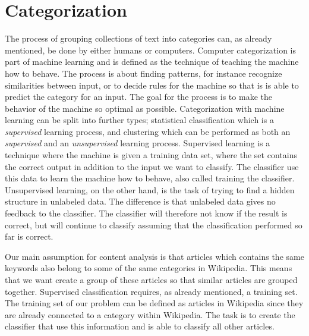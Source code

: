 \section{Categorization}
The process of grouping collections of text into categories can, as already mentioned, be done by either humans or computers. Computer categorization is part of machine learning and is defined as the technique of teaching the machine how to behave. The process is about finding patterns, for instance recognize similarities between input, or to decide rules for the machine so that is is able to predict the category for an input. The goal for the process is to make the behavior of the machine so optimal as possible. Categorization with machine learning can be split into further types; statistical classification which is a \textit{supervised} learning process, and clustering which can be performed as both an \textit{supervised} and an \textit{unsupervised} learning process. Supervised learning is a technique where the machine is given a training data set, where the set contains the correct output in addition to the input we want to classify. The classifier use this data to learn the machine how to behave, also called training the classifier. Unsupervised learning, on the other hand, is the task of trying to find a hidden structure in unlabeled data. The difference is that unlabeled data gives no feedback to the classifier. 
The classifier will therefore not know if the result is correct, but will continue to classify assuming that the classification performed so far is correct.  

Our main assumption for content analysis is that articles which contains the same keywords also belong to some of the same categories in Wikipedia. This means that we want create a group of these articles so that similar articles are grouped together. Supervised classification requires, as already mentioned, a training set. The training set of our problem can be defined as articles in Wikipedia since they are already connected to a category within Wikipedia. The task is to create the classifier that use  this information and is able to classify all other articles. 


